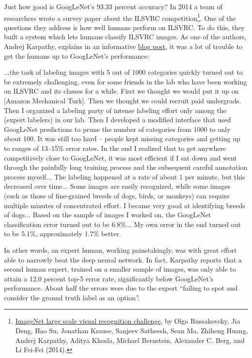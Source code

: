 \documentclass[a4paper,twoside,10pt]{book}
\begin{document}
Just how good is GoogLeNet's 93.33 percent accuracy? In 2014 a team of researchers wrote a survey paper about the ILSVRC competition\footnote{\href{http://arxiv.org/abs/1409.0575}{ImageNet large scale visual recognition challenge}, by Olga Russakovsky, Jia Deng, Hao Su, Jonathan Krause, Sanjeev Satheesh, Sean Ma, Zhiheng Huang, Andrej Karpathy, Aditya Khosla, Michael Bernstein, Alexander C. Berg, and Li Fei-Fei (2014).}. One of the questions they address is how well humans perform on ILSVRC. To do this, they built a system which lets humans classify ILSVRC images. As one of the authors, Andrej Karpathy, explains in an informative \href{http://karpathy.github.io/2014/09/02/what-i-learned-from-competing-against-a-convnet-on-imagenet/}{blog post}, it was a lot of trouble to get the humans up to GoogLeNet's performance:
\begin{adjustwidth}{1.5cm}{0.5cm}
...the task of labeling images with 5 out of 1000 categories quickly turned out to be extremely challenging, even for some friends in the lab who have been working on ILSVRC and its classes for a while. First we thought we would put it up on [Amazon Mechanical Turk]. Then we thought we could recruit paid undergrads. Then I organized a labeling party of intense labeling effort only among the (expert labelers) in our lab. Then I developed a modified interface that used GoogLeNet predictions to prune the number of categories from 1000 to only about 100. It was still too hard -- people kept missing categories and getting up to ranges of 13--15\% error rates. In the end I realized that to get anywhere competitively close to GoogLeNet, it was most efficient if I sat down and went through the painfully long training process and the subsequent careful annotation process myself... The labeling happened at a rate of about 1 per minute, but this decreased over time... Some images are easily recognized, while some images (such as those of fine-grained breeds of dogs, birds, or monkeys) can require multiple minutes of concentrated effort. I became very good at identifying breeds of dogs... Based on the sample of images I worked on, the GoogLeNet classification error turned out to be 6.8\%... My own error in the end turned out to be 5.1\%, approximately 1.7\% better.
\end{adjustwidth}
In other words, an expert human, working painstakingly, was with great effort able to narrowly beat the deep neural network. In fact, Karpathy reports that a second human expert, trained on a smaller sample of images, was only able to attain a 12.0 percent top-5 error rate, significantly below GoogLeNet's performance. About half the errors were due to the expert ``failing to spot and consider the ground truth label as an option''.
\end{document}
